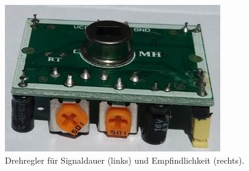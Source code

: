 \begin{minipage}{0.3\textwidth}
	\begin{figure}[H]
		\centering
		\includegraphics[width=0.83\textwidth]{pics/bewegungsmelder-hinten.jpg}
		\caption{Drehregler für Signaldauer (links) und Empfindlichkeit (rechts).}
		\label{abb:bewegungsmelder-hinten}
	\end{figure}
\end{minipage}

\vfill

